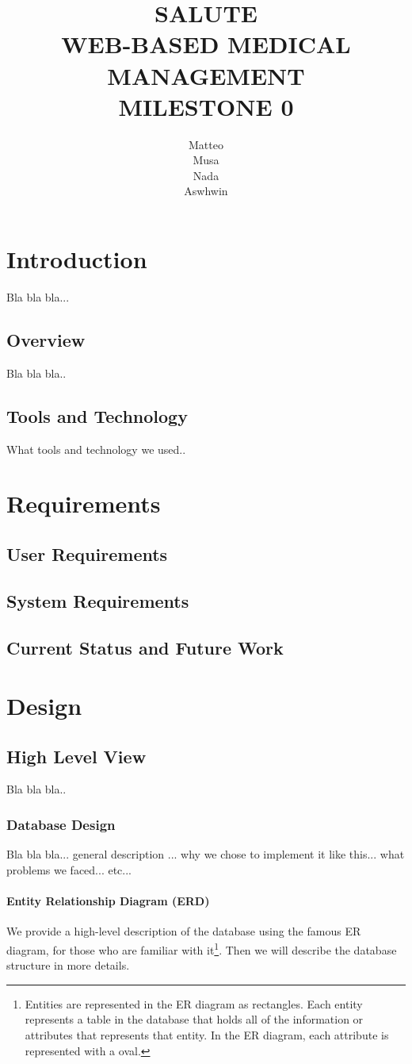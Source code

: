 \documentclass[12pt]{report}
\title{SALUTE \\ WEB-BASED MEDICAL MANAGEMENT \\ MILESTONE 0}
\author{Matteo \\ Musa \\ Nada \\ Aswhwin}
\begin{document}
\maketitle
\tableofcontents


\part{Introduction}
Bla bla bla...
\chapter{Overview}
Bla bla bla..
\chapter{Tools and Technology}
What tools and technology we used..


\part{Requirements}
\chapter{User Requirements}
\chapter{System Requirements}
\chapter{Current Status and Future Work}


\part{Design}
\chapter{High Level View}
Bla bla bla..

\section{Database Design}
Bla bla bla... general description ... why we chose to implement it like this... what problems we faced... etc...

\subsection{Entity Relationship Diagram (ERD)}
We provide a high-level description of the database using the famous ER diagram, for those who are familiar with it\footnote{Entities are represented in the ER diagram as rectangles.  Each entity represents a table in the database that holds all of the information or attributes that represents that entity.  In the ER diagram, each attribute is represented with a oval.}. Then we will describe the database structure in more details.
\end{document}
